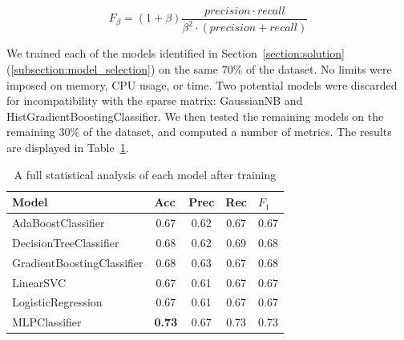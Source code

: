 \documentclass[12pt,a4paper]{article}
\begin{document}
\begin{equation}
\label{equation:f_measure}
F_\beta = (1 + \beta) \frac{precision \cdot recall}{\beta^2 \cdot (precision + recall)}
\end{equation}

 We trained each of the models identified in Section~\ref{section:solution} (\ref{subsection:model_selection}) on the same $70\%$ of the dataset. No limits were imposed on memory, CPU usage, or time. Two potential models were discarded for incompatibility with the sparse matrix: GaussianNB and HistGradientBoostingClassifier. We then tested the remaining models on the remaining $30\%$ of the dataset, and computed a number of metrics. The results are displayed in Table~\ref{table:results_explore}.

\begin{table}[htb]
\centering
\caption{A full statistical analysis of each model after training}
\label{table:results_explore}
\begin{tabular}{|p{5cm}|c|c|c|c|}
\hline
\textbf{Model}                  & \multicolumn{1}{l|}{\textbf{Acc}} & \multicolumn{1}{l|}{\textbf{Prec}} & \multicolumn{1}{l|}{\textbf{Rec}} & \multicolumn{1}{l|}{\textbf{$F_1$}} \\ \hline
AdaBoostClassifier              & 0.67                              & 0.62                               & 0.67                              & 0.67                               \\ \hline
DecisionTreeClassifier          & 0.68                              & 0.62                               & 0.69                              & 0.68                               \\ \hline
GradientBoostingClassifier      & 0.68                              & 0.63                               & 0.67                              & 0.68                               \\ \hline
LinearSVC                       & 0.67                              & 0.61                               & 0.67                              & 0.67                               \\ \hline
LogisticRegression              & 0.67                              & 0.61                               & 0.67                              & 0.67                               \\ \hline
MLPClassifier                   &\textbf{0.73}                              & 0.67                               & 0.73                              & 0.73                               \\ \hline

\end{tabular}
\end{table}
\end{document}
